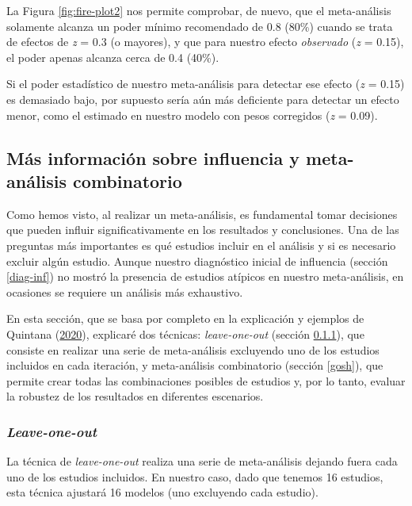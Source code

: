 \documentclass[
  bookmarksnumbered]{article}
\begin{document}
La Figura \ref{fig:fire-plot2} nos permite comprobar, de nuevo, que el meta-análisis solamente alcanza un poder mínimo recomendado de 0.8 (80\%) cuando se trata de efectos de \emph{z} = 0.3 (o mayores), y que para nuestro efecto \emph{observado} (\emph{z} = 0.15), el poder apenas alcanza cerca de 0.4 (40\%).

Si el poder estadístico de nuestro meta-análisis para detectar ese efecto (\emph{z} = 0.15) es demasiado bajo, por supuesto sería aún más deficiente para detectar un efecto menor, como el estimado en nuestro modelo con pesos corregidos (\emph{z} = 0.09).

\hypertarget{todas-combinaciones}{%
\subsection{Más información sobre influencia y meta-análisis combinatorio}\label{todas-combinaciones}}

Como hemos visto, al realizar un meta-análisis, es fundamental tomar decisiones que pueden influir significativamente en los resultados y conclusiones. Una de las preguntas más importantes es qué estudios incluir en el análisis y si es necesario excluir algún estudio. Aunque nuestro diagnóstico inicial de influencia (sección \ref{diag-inf}) no mostró la presencia de estudios atípicos en nuestro meta-análisis, en ocasiones se requiere un análisis más exhaustivo.

En esta sección, que se basa por completo en la explicación y ejemplos de Quintana (\protect\hyperlink{ref-quintanaOhMyGOSH2020}{2020}), explicaré dos técnicas: \emph{leave-one-out} (sección \ref{leave-one-out}), que consiste en realizar una serie de meta-análisis excluyendo uno de los estudios incluidos en cada iteración, y meta-análisis combinatorio (sección \ref{gosh}), que permite crear todas las combinaciones posibles de estudios y, por lo tanto, evaluar la robustez de los resultados en diferentes escenarios.

\hypertarget{leave-one-out}{%
\subsubsection{\texorpdfstring{\emph{Leave-one-out}}{Leave-one-out}}\label{leave-one-out}}

La técnica de \emph{leave-one-out} realiza una serie de meta-análisis dejando fuera cada uno de los estudios incluidos. En nuestro caso, dado que tenemos 16 estudios, esta técnica ajustará 16 modelos (uno excluyendo cada estudio).
\end{document}
